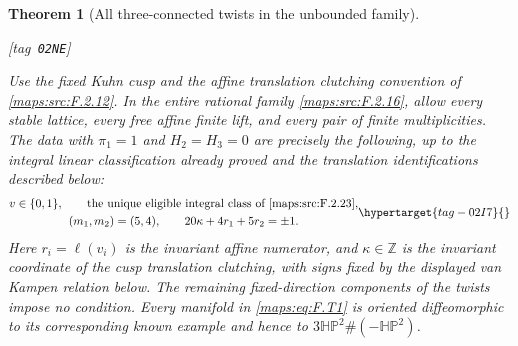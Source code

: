 \documentclass[11pt,a4paper]{article}
\numberwithin{equation}{section}
\newtheorem{theorem}{Theorem}[section]
\theoremstyle{definition}
\newcommand{\StatementRecord}[4]{{\upshape\footnotesize[tag~\texttt{#3}]}\enspace\ignorespaces}
\begin{document}
\begin{theorem}[All three-connected twists in the unbounded family]\hypertarget{tag-02NE}{}\label{maps:src:F.2.24}
\StatementRecord{maps:src:F.2.24}{proved}{02NE}{\cref{maps:src:F.2.12}, \cref{maps:src:F.2.16}, \cref{maps:src:F.2.23}, \cref{maps:src:F.2.20}, \cref{maps:src:F.2.19}, \eqref{maps:eq:F.U6}, \cref{pub:V:smooth-gluing}, \cref{maps:src:F.2.18}, \eqref{maps:eq:F.T4}, \cref{maps:src:F.2.6}, \cref{pub:V:integral-restrictions}, \eqref{maps:eq:F.T6}, \eqref{maps:eq:F.T7}, \eqref{maps:eq:F.T5}, \eqref{maps:eq:F.T8}, \eqref{maps:eq:F.T3}, \eqref{maps:eq:F.T2}, \eqref{maps:eq:F.T9}}


Use the fixed Kuhn cusp and the affine translation clutching
convention of \ref{maps:src:F.2.12}.  In the entire rational family \ref{maps:src:F.2.16},
allow every stable lattice, every free affine finite lift,
and every pair of finite multiplicities.
The data with $\pi_1=1$ and $H_2=H_3=0$ are precisely the
following, up to the integral linear classification already
proved and the translation identifications described below:
\begin{equation}
\begin{gathered}
 v\in\{0,1\},\qquad
 \text{the unique eligible integral class of \ref{maps:src:F.2.23}},\\
 (m_1,m_2)=(5,4),\qquad
 20\kappa+4r_1+5r_2=\pm1.
\end{gathered}
 \hypertarget{tag-02I7}{}\label{maps:eq:F.T1}
\end{equation}
Here $r_i=\ell(v_i)$ is the invariant affine numerator, and
$\kappa\in\mathbb Z$ is the invariant coordinate of the
cusp translation clutching, with signs fixed by the displayed
van Kampen relation below.  The remaining fixed-direction
components of the twists impose no condition.
Every manifold in \eqref{maps:eq:F.T1} is oriented diffeomorphic to its corresponding known example and hence to
$3\mathbb{HP}^2\#(-\mathbb{HP}^2)$.

\end{theorem}
\end{document}

